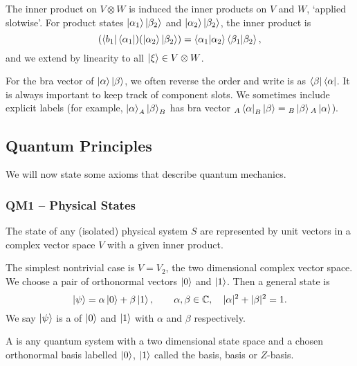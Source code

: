 \documentclass[a4paper]{article}
\begin{document}
The inner product on $V \otimes W$ is induced the inner products on $V$ and $W$, `applied slotwise'. For product states $\ket{\alpha_1} \ket{\beta_2}$ and $\ket{\alpha_2} \ket{\beta_2}$, the inner product is
$$
(\bra{b_1} \bra{\alpha_1})(\ket{\alpha_2} \ket{\beta_2}) = \ip{\alpha_1}{\alpha_2} \ip{\beta_1}{\beta_2},
$$
and we extend by linearity to all $\ket{\xi} \in V \otimes W$.

\begin{remark}[Notation]
	For the bra vector of $\ket{\alpha} \ket{\beta}$, we often reverse the order and write is as $\bra{\beta} \bra{\alpha}$. It is always important to keep track of component slots. We sometimes include explicit labels (for example, $\ket{\alpha}_A \ket{\beta}_B$ has bra vector ${}_A\bra{\alpha} {}_B \ket{\beta} = {}_B\ket{\beta} {}_A \ket{\alpha}$). 
\end{remark}

\subsection{Quantum Principles}

We will now state some axioms that describe quantum mechanics.

\subsubsection{QM1 -- Physical States}

\begin{axiom*}[QM1]
	The state of any (isolated) physical system $S$ are represented by unit vectors in a complex vector space $V$ with a given inner product.
\end{axiom*}

The simplest nontrivial case is $V = V_2$, the two dimensional complex vector space. We choose a pair of orthonormal vectors $\ket{0}$ and $\ket{1}$. Then a general state is
$$
\ket{\psi} = \alpha \ket{0} + \beta \ket{1}, \quad \quad \alpha, \beta \in \mathbb{C}, \quad |\alpha|^2 + |\beta|^2 = 1.
$$
We say $\ket{\psi}$ is a  of $\ket{0}$ and $\ket{1}$ with  $\alpha$ and $\beta$ respectively.

\begin{definition}[Qubit]
	A  is any quantum system with a two dimensional state space and a chosen orthonormal basis labelled $\ket{0}$, $\ket{1}$ called the  basis,  basis or $Z$-basis.
\end{definition}
\end{document}
